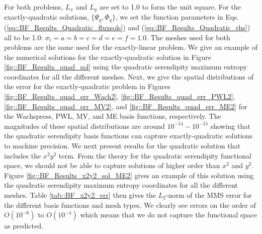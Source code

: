 For both problems, $L_x$ and $L_y$ are set to 1.0 to form the unit square. For the exactly-quadratic solutions, $\{\Psi_q, \Phi_q\}$, we set the function parameters in Eqs. (\ref{eq::BF_Results_Quadratic_fluxsols}) and (\ref{eq::BF_Results_Quadratic_rhs}) all to be 1.0: $\sigma_t=a=b=c=d=e=f=1.0$. The meshes used for both problems are the same used for the exactly-linear problem. We give an example of the numerical solutions for the exactly-quadratic solution in Figure \ref{fig::BF_Results_quad_sol} using the quadratic serendipity maximum entropy coordinates for all the different meshes. Next, we give the spatial distributions of the error for the exactly-quadratic problem in Figures \ref{fig::BF_Results_quad_err_Wach2}, \ref{fig::BF_Results_quad_err_PWL2}, \ref{fig::BF_Results_quad_err_MV2}, and \ref{fig::BF_Results_quad_err_ME2} for the Wachspress, PWL, MV, and ME basis functions, respectively. The magnitudes of these spatial distributions are around $10^{-14}-10^{-15}$ showing that the quadratic serendipity basis functions can capture exactly-quadratic solutions to machine precision. We next present results for the quadratic solution that includes the $x^2 y^2$ term. From the theory for the quadratic serendipity functional space, we should not be able to capture solutions of higher order than $x^2$ and $y^2$. Figure \ref{fig::BF_Results_x2y2_sol_ME2} gives an example of this solution using the quadratic serendipity maximum entropy coordinates for all the different meshes. Table \ref{tab::BF_x2y2_err} then gives the $L_2$-norm of the MMS error for the different basis functions and mesh types. We clearly see errors on the order of $O(10^{-6})$ to $O(10^{-4})$ which means that we do not capture the functional space as predicted.

